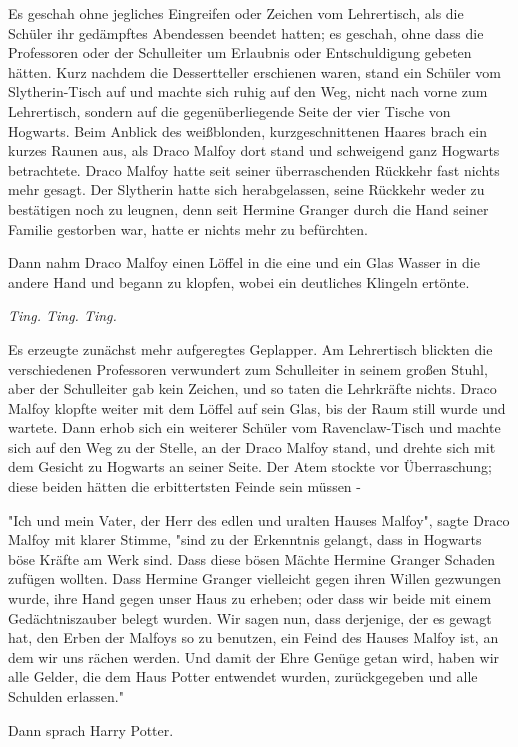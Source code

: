 {Es geschah ohne jegliches Eingreifen oder Zeichen vom Lehrertisch, als die Schüler ihr gedämpftes Abendessen beendet hatten; es geschah, ohne dass die Professoren oder der Schulleiter um Erlaubnis oder Entschuldigung gebeten hätten. Kurz nachdem die Dessertteller erschienen waren, stand ein Schüler vom Slytherin-Tisch auf und machte sich ruhig auf den Weg, nicht nach vorne zum Lehrertisch, sondern auf die gegenüberliegende Seite der vier Tische von Hogwarts. Beim Anblick des weißblonden, kurzgeschnittenen Haares brach ein kurzes Raunen aus, als Draco Malfoy dort stand und schweigend ganz Hogwarts betrachtete. Draco Malfoy hatte seit seiner überraschenden Rückkehr fast nichts mehr gesagt. Der Slytherin hatte sich herabgelassen, seine Rückkehr weder zu bestätigen noch zu leugnen, denn seit Hermine Granger durch die Hand seiner Familie gestorben war, hatte er nichts mehr zu befürchten.

Dann nahm Draco Malfoy einen Löffel in die eine und ein Glas Wasser in die andere Hand und begann zu klopfen, wobei ein deutliches Klingeln ertönte.

\emph{Ting. Ting. Ting.}

Es erzeugte zunächst mehr aufgeregtes Geplapper. Am Lehrertisch blickten die verschiedenen Professoren verwundert zum Schulleiter in seinem großen Stuhl, aber der Schulleiter gab kein Zeichen, und so taten die Lehrkräfte nichts. Draco Malfoy klopfte weiter mit dem Löffel auf sein Glas, bis der Raum still wurde und wartete. Dann erhob sich ein weiterer Schüler vom Ravenclaw-Tisch und machte sich auf den Weg zu der Stelle, an der Draco Malfoy stand, und drehte sich mit dem Gesicht zu Hogwarts an seiner Seite. Der Atem stockte vor Überraschung; diese beiden hätten die erbittertsten Feinde sein müssen -

"Ich und mein Vater, der Herr des edlen und uralten Hauses Malfoy", sagte Draco Malfoy mit klarer Stimme, "sind zu der Erkenntnis gelangt, dass in Hogwarts böse Kräfte am Werk sind. Dass diese bösen Mächte Hermine Granger Schaden zufügen wollten. Dass Hermine Granger vielleicht gegen ihren Willen gezwungen wurde, ihre Hand gegen unser Haus zu erheben; oder dass wir beide mit einem Gedächtniszauber belegt wurden. Wir sagen nun, dass derjenige, der es gewagt hat, den Erben der Malfoys so zu benutzen, ein Feind des Hauses Malfoy ist, an dem wir uns rächen werden. Und damit der Ehre Genüge getan wird, haben wir alle Gelder, die dem Haus Potter entwendet wurden, zurückgegeben und alle Schulden erlassen."

Dann sprach Harry Potter.

}
